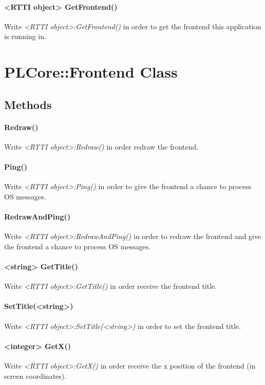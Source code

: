 \paragraph{<RTTI object> GetFrontend()}
Write \emph{<RTTI object>:GetFrontend()} in order to get the frontend this application is running in.




\section{PLCore::Frontend Class}


\subsection{Methods}

\paragraph{Redraw()}
Write \emph{<RTTI object>:Redraw()} in order redraw the frontend.

\paragraph{Ping()}
Write \emph{<RTTI object>:Ping()} in order to give the frontend a chance to process \ac{OS} messages.

\paragraph{RedrawAndPing()}
Write \emph{<RTTI object>:RedrawAndPing()} in order to redraw the frontend and give the frontend a chance to process \ac{OS} messages.

\paragraph{<string> GetTitle()}
Write \emph{<RTTI object>:GetTitle()} in order receive the frontend title.

\paragraph{SetTitle(<string>)}
Write \emph{<RTTI object>:SetTitle(<string>)} in order to set the frontend title.

\paragraph{<integer> GetX()}
Write \emph{<RTTI object>:GetX()} in order receive the x position of the frontend (in screen coordinates).

